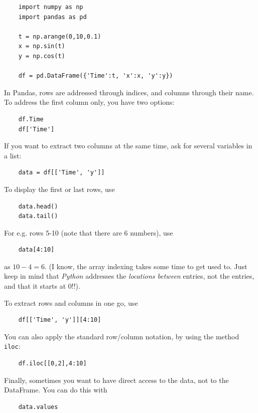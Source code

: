 \begin{lstlisting}
    import numpy as np
    import pandas as pd

    t = np.arange(0,10,0.1)
    x = np.sin(t)
    y = np.cos(t)

    df = pd.DataFrame({'Time':t, 'x':x, 'y':y})
\end{lstlisting}

In Pandas, rows are addressed through indices, and columns through their name.
To address the first column only, you have two options:

\begin{lstlisting}
    df.Time
    df['Time']
\end{lstlisting}

If you want to extract two columns at the same time, ask for several variables in a list:

\begin{lstlisting}
    data = df[['Time', 'y']]
\end{lstlisting}

To display the first or last rows, use

\begin{lstlisting}
    data.head()
    data.tail()
\end{lstlisting}

For e.g. rows 5-10 (note that there are 6 numbers), use

\begin{lstlisting}
    data[4:10]
\end{lstlisting}

as $10-4=6$. (I know, the array indexing takes some time to get used to. Just keep in mind that \emph{Python} addresses the \emph{locations between} entries, not the entries, and that it starts at $0$!!).

To extract rows and columns in one go, use

\begin{lstlisting}
    df[['Time', 'y']][4:10]
\end{lstlisting}

You can also apply the standard row/column notation, by using the method \lstinline{iloc}:

\begin{lstlisting}
    df.iloc[[0,2],4:10]
\end{lstlisting}

Finally, sometimes you want to have direct access to the data, not to the DataFrame. You can do this with

\begin{lstlisting}
    data.values
\end{lstlisting}


